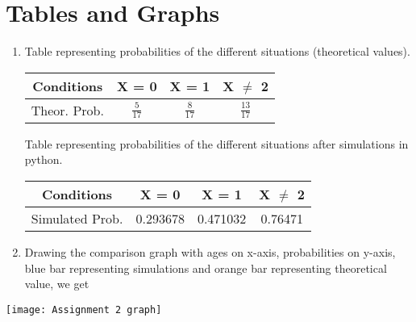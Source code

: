 \documentclass[journal,12pt,twocolumn]{IEEEtran}
\begin{document}
\section* {Tables and Graphs} 
\begin{enumerate}
\item Table representing probabilities of the different situations (theoretical values).
\begin{center}
    \begin{tabular}{|c|c|c|c|}
    \hline
    {Conditions} & X = 0    & X = 1    & X $\ne$ 2    \\
    \hline
    {Theor. Prob.} & $\frac{5}{17}$ & $\frac{8}{17}$ & $\frac{13}{17}$ \\
    \hline
    \end{tabular}
\end{center}

Table representing probabilities of the different situations after simulations in python.
\begin{center}
    \begin{tabular}{|c|c|c|c|}
    \hline
    {Conditions} & X = 0    & X = 1    & X $\ne$ 2    \\
    \hline
    {Simulated Prob.} & 0.293678 & 0.471032 & 0.76471 \\
    \hline
    \end{tabular}
\end{center}

\item Drawing the comparison graph with ages on x-axis, probabilities on y-axis, blue bar representing simulations and orange bar representing theoretical value, we get
\end{enumerate}
\texttt{[image: Assignment 2 graph]}
\end{document}
